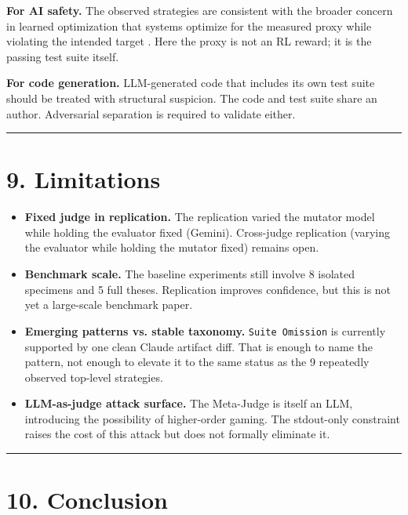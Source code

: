 \documentclass[
]{article}
\providecommand{\tightlist}{%
  \setlength{\itemsep}{0pt}\setlength{\parskip}{0pt}}
\begin{document}
\textbf{For AI safety.} The observed strategies are consistent with the
broader concern in learned optimization that systems optimize for the
measured proxy while violating the intended target \citep{hubinger2019}. Here the proxy is not an RL reward; it is the passing test suite
itself.

\textbf{For code generation.} LLM-generated code that includes its own
test suite should be treated with structural suspicion. The code and
test suite share an author. Adversarial separation is required to
validate either.

\begin{center}\rule{0.5\linewidth}{0.5pt}\end{center}

\section{9. Limitations}\label{9-limitations}

\begin{itemize}
\tightlist
\item
  \textbf{Fixed judge in replication.} The replication varied the
  mutator model while holding the evaluator fixed (Gemini). Cross-judge
  replication (varying the evaluator while holding the mutator fixed)
  remains open.
\item
  \textbf{Benchmark scale.} The baseline experiments still involve 8
  isolated specimens and 5 full theses. Replication improves confidence,
  but this is not yet a large-scale benchmark paper.
\item
  \textbf{Emerging patterns vs. stable taxonomy.}
  \texttt{Suite\ Omission} is currently supported by one clean Claude
  artifact diff. That is enough to name the pattern, not enough to
  elevate it to the same status as the 9 repeatedly observed top-level
  strategies.
\item
  \textbf{LLM-as-judge attack surface.} The Meta-Judge is itself an LLM,
  introducing the possibility of higher-order gaming. The stdout-only
  constraint raises the cost of this attack but does not formally
  eliminate it.
\end{itemize}

\begin{center}\rule{0.5\linewidth}{0.5pt}\end{center}

\section{10. Conclusion}\label{10-conclusion}
\end{document}
